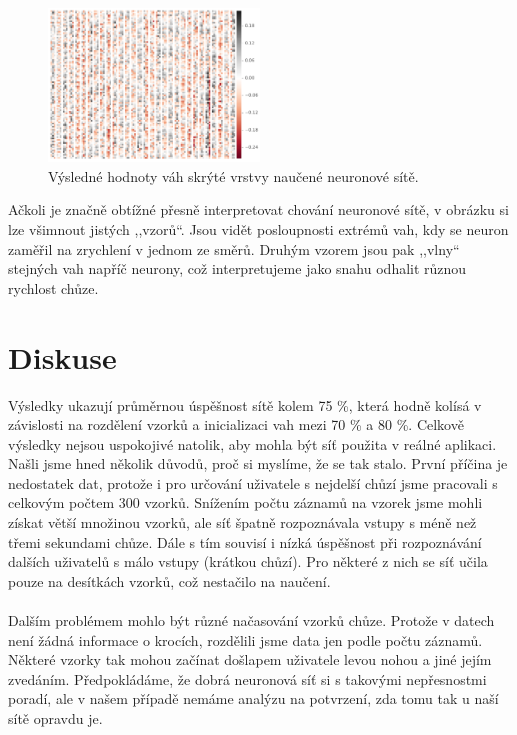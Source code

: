 \documentclass[a4paper, 10pt, twocolumn]{article}
\begin{document}
\begin{figure}[ht]
\centering
\includegraphics[width=0.5\textwidth]{img/weights.pdf}
\caption{Výsledné hodnoty váh skrýté vrstvy naučené neuronové sítě.}
\label{weighs}
\end{figure}


Ačkoli je značně obtížné přesně interpretovat chování neuronové sítě, v obrázku si lze všimnout jistých ,,vzorů``. Jsou vidět posloupnosti extrémů vah, kdy se neuron zaměřil na zrychlení v jednom ze směrů. Druhým vzorem jsou pak ,,vlny`` stejných vah napříč neurony, což interpretujeme jako snahu odhalit různou rychlost chůze.
\section{Diskuse}
    Výsledky ukazují průměrnou úspěšnost sítě kolem 75 \%, která hodně kolísá v závislosti na rozdělení vzorků a inicializaci vah mezi 70 \% a 80 \%. Celkově výsledky nejsou uspokojivé natolik, aby mohla být síť použita v reálné aplikaci. Našli jsme hned několik důvodů, proč si myslíme, že se tak stalo. První příčina je nedostatek dat, protože i pro určování uživatele s nejdelší chůzí jsme pracovali s celkovým počtem 300 vzorků. Snížením počtu záznamů na vzorek jsme mohli získat větší množinou vzorků, ale síť špatně rozpoznávala vstupy s méně než třemi sekundami chůze. Dále s tím souvisí i nízká úspěšnost při rozpoznávání dalších uživatelů s málo vstupy (krátkou chůzí). Pro některé z nich se síť učila pouze na desítkách vzorků, což nestačilo na naučení.
    \paragraph{}
    Dalším problémem mohlo být různé načasování vzorků chůze. Protože v datech není žádná informace o krocích, rozdělili jsme data jen podle počtu záznamů. Některé vzorky tak mohou začínat došlapem uživatele levou nohou a jiné jejím zvedáním. Předpokládáme, že dobrá neuronová síť si s takovými nepřesnostmi poradí, ale v našem případě nemáme analýzu na potvrzení, zda tomu tak u naší sítě opravdu je.
\end{document}
